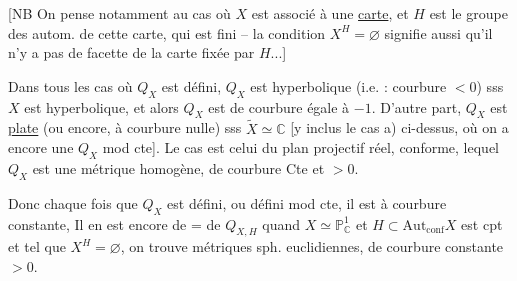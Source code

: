 
[NB On pense notamment au cas où $X$ est associé à une \uline{carte}, et $H$ est le groupe des autom. de cette carte, qui est fini -- la condition $X^H=\varnothing$ signifie aussi qu'il n'y a pas de facette de la carte fixée par $H$...]

Dans tous les cas où $Q_X$ est défini, $Q_X$ est hyperbolique (i.e. : courbure $<0$) sss $X$ est hyperbolique, et alors $Q_X$ est de courbure  égale à $-1$. D'autre part, $Q_X$ est \uline{plate}  (ou encore, à courbure nulle) sss $\widetilde X\simeq\mathbb C$ [y inclus le cas a) ci-dessus, où on a encore une $Q_X$ mod cte]. Le cas  est celui du plan projectif réel, conforme,   lequel $Q_X$ est une métrique homogène, de courbure Cte  et $>0$.

Donc chaque fois que $Q_X$ est défini, ou défini mod cte, il est à courbure constante,  Il en est encore de = de $Q_{X,H}$ quand $X\simeq\mathbb P^1_{\mathbb C}$ et $H\subset\mathrm{Aut}_{\mathrm{conf}}X$ est cpt et tel que $X^H=\varnothing$, on trouve  métriques sph. euclidiennes,  de courbure constante $>0$.

